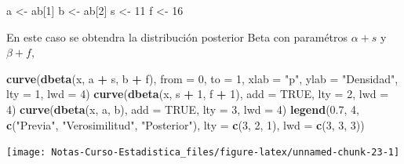 \documentclass[
  12pt,
]{book}
\newenvironment{Shaded}{\begin{snugshade}}{\end{snugshade}}
\newcommand{\DataTypeTok}[1]{\textcolor[rgb]{0.13,0.29,0.53}{#1}}
\newcommand{\DecValTok}[1]{\textcolor[rgb]{0.00,0.00,0.81}{#1}}
\newcommand{\FloatTok}[1]{\textcolor[rgb]{0.00,0.00,0.81}{#1}}
\newcommand{\KeywordTok}[1]{\textcolor[rgb]{0.13,0.29,0.53}{\textbf{#1}}}
\newcommand{\NormalTok}[1]{#1}
\newcommand{\OperatorTok}[1]{\textcolor[rgb]{0.81,0.36,0.00}{\textbf{#1}}}
\newcommand{\OtherTok}[1]{\textcolor[rgb]{0.56,0.35,0.01}{#1}}
\newcommand{\StringTok}[1]{\textcolor[rgb]{0.31,0.60,0.02}{#1}}
\begin{document}
\begin{Shaded}
\begin{Highlighting}[]
\NormalTok{a \textless{}{-}}\StringTok{ }\NormalTok{ab[}\DecValTok{1}\NormalTok{]}
\NormalTok{b \textless{}{-}}\StringTok{ }\NormalTok{ab[}\DecValTok{2}\NormalTok{]}
\NormalTok{s \textless{}{-}}\StringTok{ }\DecValTok{11}
\NormalTok{f \textless{}{-}}\StringTok{ }\DecValTok{16}
\end{Highlighting}
\end{Shaded}

En este caso se obtendra la distribución posterior Beta con paramétros \(\alpha + s\) y \(\beta + f\),

\begin{Shaded}
\begin{Highlighting}[]
\KeywordTok{curve}\NormalTok{(}\KeywordTok{dbeta}\NormalTok{(x, a }\OperatorTok{+}\StringTok{ }\NormalTok{s, b }\OperatorTok{+}\StringTok{ }\NormalTok{f), }\DataTypeTok{from =} \DecValTok{0}\NormalTok{, }\DataTypeTok{to =} \DecValTok{1}\NormalTok{, }\DataTypeTok{xlab =} \StringTok{"p"}\NormalTok{, }
    \DataTypeTok{ylab =} \StringTok{"Densidad"}\NormalTok{, }\DataTypeTok{lty =} \DecValTok{1}\NormalTok{, }\DataTypeTok{lwd =} \DecValTok{4}\NormalTok{)}
\KeywordTok{curve}\NormalTok{(}\KeywordTok{dbeta}\NormalTok{(x, s }\OperatorTok{+}\StringTok{ }\DecValTok{1}\NormalTok{, f }\OperatorTok{+}\StringTok{ }\DecValTok{1}\NormalTok{), }\DataTypeTok{add =} \OtherTok{TRUE}\NormalTok{, }\DataTypeTok{lty =} \DecValTok{2}\NormalTok{, }
    \DataTypeTok{lwd =} \DecValTok{4}\NormalTok{)}
\KeywordTok{curve}\NormalTok{(}\KeywordTok{dbeta}\NormalTok{(x, a, b), }\DataTypeTok{add =} \OtherTok{TRUE}\NormalTok{, }\DataTypeTok{lty =} \DecValTok{3}\NormalTok{, }\DataTypeTok{lwd =} \DecValTok{4}\NormalTok{)}
\KeywordTok{legend}\NormalTok{(}\FloatTok{0.7}\NormalTok{, }\DecValTok{4}\NormalTok{, }\KeywordTok{c}\NormalTok{(}\StringTok{"Previa"}\NormalTok{, }\StringTok{"Verosimilitud"}\NormalTok{, }\StringTok{"Posterior"}\NormalTok{), }
    \DataTypeTok{lty =} \KeywordTok{c}\NormalTok{(}\DecValTok{3}\NormalTok{, }\DecValTok{2}\NormalTok{, }\DecValTok{1}\NormalTok{), }\DataTypeTok{lwd =} \KeywordTok{c}\NormalTok{(}\DecValTok{3}\NormalTok{, }\DecValTok{3}\NormalTok{, }\DecValTok{3}\NormalTok{))}
\end{Highlighting}
\end{Shaded}

\begin{center}\texttt{[image: Notas-Curso-Estadistica\_files/figure-latex/unnamed-chunk-23-1]} \end{center}
\end{document}
